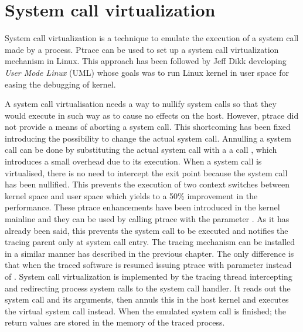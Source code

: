 \section{System call virtualization}
\label{system_call_virtualization}
 
System call virtualization is a technique to emulate the execution of a system call made by a process. Ptrace can be used to set up a system call virtualization mechanism in Linux. This approach has been followed by Jeff Dikk \cite{UML_1, UML_2} developing \textit{User Mode Linux} (UML) whose goals was to run Linux kernel in user space for easing the debugging of kernel. 

A system call virtualisation needs a way to nullify system calls so that they would execute in such way as to cause no effects on the host.  However, ptrace did not provide a means of aborting a system call. This shortcoming has been fixed introducing the possibility to change the actual system call. Annulling a system call can be done by substituting the actual system call with a a call , which introduces a small overhead due to its execution. 
When a system call is virtualised, there is no need to intercept the exit point because the system call has been nullified.  This prevents the execution of two context switches between kernel space and user space which yields to a 50\% improvement in the performance. These ptrace enhancements have been introduced in the kernel mainline and they can be used by calling ptrace with the parameter  \cite{ptrace}. As it has already been said, this prevents the system call to be executed and notifies the tracing parent only at system call entry.  
The tracing mechanism can be installed in a similar manner has described in the previous chapter. The only difference is that when the traced software is resumed issuing ptrace with  parameter instead of . 
System call virtualization is implemented by the tracing thread intercepting and redirecting process system calls to the system call handler.  It reads out the system call and its arguments, then annuls this in the host kernel and executes the virtual system call instead. When the emulated system call is finished; the return values are stored in the memory of the traced process.


